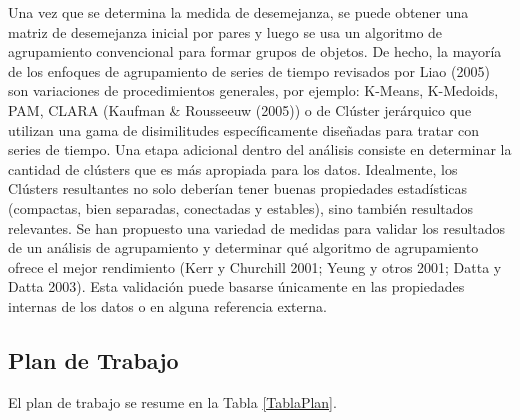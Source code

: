 \documentclass[10pt,a5paper]{article}
\begin{document}
Una vez que se determina la medida de desemejanza, se puede obtener una matriz de desemejanza inicial por pares y luego se usa un algoritmo de agrupamiento convencional para formar grupos de objetos. De hecho, la mayoría de los enfoques de agrupamiento de series de tiempo revisados por Liao (2005) son variaciones de procedimientos generales, por ejemplo: K-Means, K-Medoids, PAM, CLARA (Kaufman \& Rousseeuw (2005)) o de Clúster jerárquico que utilizan una gama de disimilitudes específicamente diseñadas para tratar con series de tiempo. 
Una etapa adicional dentro del análisis consiste en determinar la cantidad de clústers que es más apropiada para los datos. Idealmente, los Clústers resultantes no solo deberían tener buenas propiedades estadísticas (compactas, bien separadas, conectadas y estables), sino también resultados relevantes. Se han propuesto una variedad de medidas para validar los resultados de un análisis de agrupamiento y determinar qué algoritmo de agrupamiento ofrece el mejor rendimiento  (Kerr y Churchill 2001; Yeung y otros 2001; Datta y Datta 2003). Esta validación puede basarse únicamente en las propiedades internas de los datos o en alguna referencia externa.

\subsection{Plan de Trabajo}

El plan de trabajo se resume en la Tabla \ref{TablaPlan}.
\end{document}
